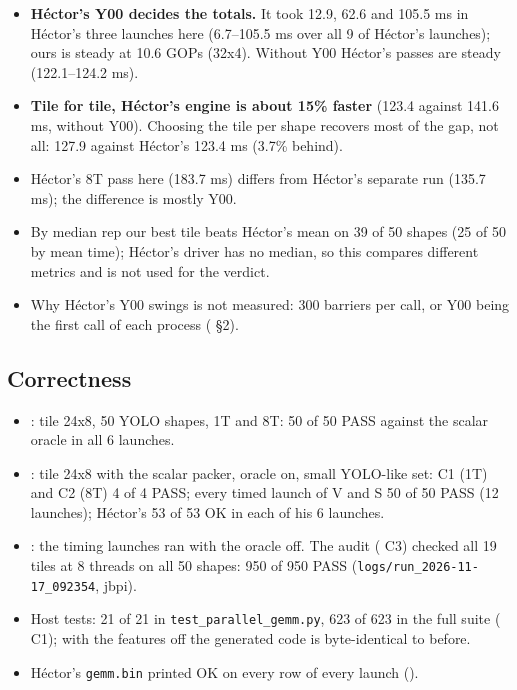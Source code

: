 \begin{itemize}\setlength\itemsep{1pt}
\item \textbf{H\'ector's Y00 decides the totals.} It took 12.9, 62.6 and 105.5 ms in H\'ector's three launches here (6.7--105.5 ms over all 9 of H\'ector's launches); ours is steady at 10.6 GOPs (32x4). Without Y00 H\'ector's passes are steady (122.1--124.2 ms).
\item \textbf{Tile for tile, H\'ector's engine is about 15\% faster} (123.4 against 141.6 ms, without Y00). Choosing the tile per shape recovers most of the gap, not all: 127.9 against H\'ector's 123.4 ms (3.7\% behind).
\item H\'ector's 8T pass here (183.7 ms) differs from H\'ector's separate  run (135.7 ms); the difference is mostly Y00.
\item By median rep our best tile beats H\'ector's mean on 39 of 50 shapes (25 of 50 by mean time); H\'ector's driver has no median, so this compares different metrics and is not used for the verdict.
\item Why H\'ector's Y00 swings is not measured: 300 barriers per call, or Y00 being the first call of each process ( \S2).
\end{itemize}

\subsection{Correctness}
\begin{itemize}\setlength\itemsep{1pt}
\item {}: tile 24x8, 50 YOLO shapes, 1T and 8T: 50 of 50 PASS against the scalar oracle in all 6 launches.
\item {}: tile 24x8 with the scalar packer, oracle on, small YOLO-like set: C1 (1T) and C2 (8T) 4 of 4 PASS; every timed launch of V and S 50 of 50 PASS (12 launches); H\'ector's 53 of 53 OK in each of his 6 launches.
\item {}: the timing launches ran with the oracle off. The audit ( C3) checked all 19 tiles at 8 threads on all 50 shapes: 950 of 950 PASS (\texttt{logs/run\_2026-11-17\_092354}, jbpi).
\item Host tests: 21 of 21 in \texttt{test\_parallel\_gemm.py}, 623 of 623 in the full suite ( C1); with the features off the generated code is byte-identical to before.
\item H\'ector's \texttt{gemm.bin} printed OK on every row of every launch ().
\end{itemize}
